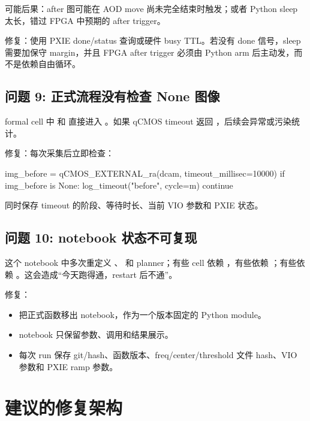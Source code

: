 \documentclass[11pt,oneside,openany]{book}
\begin{document}
可能后果：after 图可能在 AOD move 尚未完全结束时触发；或者 Python sleep 太长，错过 FPGA 中预期的 after trigger。

修复：使用 PXIE done/status 查询或硬件 busy TTL。若没有 done 信号，sleep 需要加保守 margin，并且 FPGA after trigger 必须由 Python arm 后主动发，而不是依赖自由循环。

\section{问题 9: 正式流程没有检查 None 图像}
formal cell 中  和  直接进入 。如果 qCMOS timeout 返回 ，后续会异常或污染统计。

修复：每次采集后立即检查：
\begin{codeblock}[Python]
img_before = qCMOS_EXTERNAL_ra(dcam, timeout_millisec=10000)
if img_before is None:
    log_timeout("before", cycle=m)
    continue
\end{codeblock}
同时保存 timeout 的阶段、等待时长、当前 VIO 参数和 PXIE 状态。

\section{问题 10: notebook 状态不可复现}
这个 notebook 中多次重定义 、 和 planner；有些 cell 依赖 ，有些依赖 ；有些依赖 。这会造成“今天跑得通，restart 后不通”。

修复：
\begin{itemize}
  \item 把正式函数移出 notebook，作为一个版本固定的 Python module。
  \item notebook 只保留参数、调用和结果展示。
  \item 每次 run 保存 git/hash、函数版本、freq/center/threshold 文件 hash、VIO 参数和 PXIE ramp 参数。
\end{itemize}

\chapter{建议的修复架构}
\end{document}
